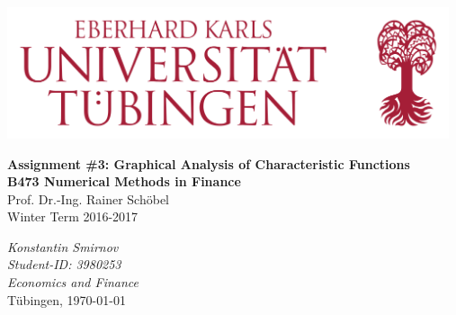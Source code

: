 \documentclass[a4paper,11pt]{article}
\begin{document}




\begin{titlepage}       %

\thispagestyle{empty}   %

\begin{center}
\includegraphics[width=13cm]{Bild.png}
\end{center}

\begin{center}

\vspace*{1.5cm}
{\bf  \Large Assignment \#3: Graphical Analysis of Characteristic Functions} \\
\vspace*{2cm} 
\textbf{B473 Numerical Methods in Finance}
\\
Prof. Dr.-Ing. Rainer Sch\"obel
\\
\vspace*{0.5cm} 
Winter Term 2016-2017\\
\end{center}

\vfill
\begin{flushright}
    \emph{Konstantin Smirnov}\\
    \textit{Student-ID: 3980253}\\
     \textit{ Economics and Finance}\\
 T\"ubingen, \today
  




\end{flushright}



% 
% 
% 

\end{titlepage}
\end{document}
